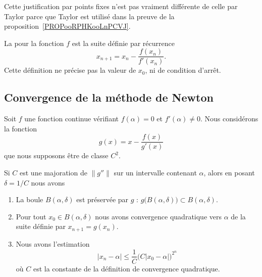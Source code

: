 \begin{remark}
    Cette justification par points fixes n'est pas vraiment différente de celle par Taylor parce que Taylor est utilisé dans la preuve de la proposition~\ref{PROPooRPHKooLnPCVJ}.
\end{remark}

\begin{definition}
    La  pour la fonction \( f\) est la suite définie par récurrence
    \begin{equation}
        x_{n+1}=x_n-\frac{ f(x_n)  }{ f'(x_n) }.
    \end{equation}
    Cette définition ne précise pas la valeur de \( x_0\), ni de condition d'arrêt.
\end{definition}

\subsection{Convergence de la méthode de Newton}

\begin{theorem}       \label{THOooDOVSooWsAFkx}
    Soit \( f\) une fonction continue vérifiant \( f(\alpha)=0\) et \( f'(\alpha)\neq 0\). Nous considérons la fonction
    \begin{equation}
        g(x)=x-\frac{ f(x) }{ g'(x) }
    \end{equation}
    que nous supposons être de classe \( C^2\).

    Si \( C\) est une majoration de \( \| g'' \|\) sur un intervalle contenant \( \alpha\), alors en posant \( \delta=1/C\) nous avons
    \begin{enumerate}
        \item       \label{ITEMooVXSKooWCVWQc}
            La boule \( B(\alpha,\delta)\) est préservée par \( g\) : \( g\big( B(\alpha,\delta) \big)\subset B(\alpha,\delta)\).
        \item       \label{ITEMooZPSXooGgbfhG}
            Pour tout \( x_0\in B(\alpha,\delta)\) nous avons convergence quadratique vers \( \alpha\) de la suite définie par \( x_{n+1}=g(x_n)\).
        \item       \label{ITEMooZCXZooCjeWPl}
            Nous avons l'estimation
            \begin{equation}        \label{EQooFAIPooDpoNWK}
                | x_n-\alpha |\leq \frac{1}{ C }\big( C| x_0-\alpha | \big)^{2^n}
            \end{equation}
            où \( C\) est la constante de la définition de convergence quadratique.
    \end{enumerate}
\end{theorem}

